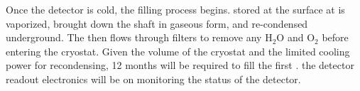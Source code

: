 Once the detector is cold, the filling process begins.  stored at the surface  at  is vaporized, brought down the shaft in gaseous form, and re-condensed underground. The \lar then flows through filters to remove any H$_2$O and O$_2$ before entering the cryostat. Given the volume of the cryostat and the limited cooling power for recondensing, \num{12} months will be required to fill the first . the detector readout electronics will be on monitoring the status of the detector. 

